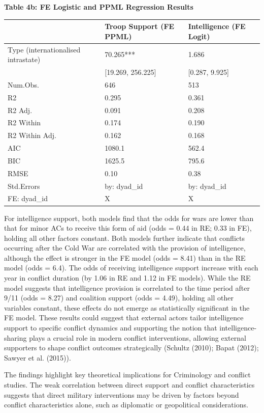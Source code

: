 \documentclass[
]{article}
\begin{document}
\noindent\textbf{Table 4b: FE Logistic and PPML Regression Results}

\begin{tabular}{lll}
\hline
& Troop Support (FE PPML) & Intelligence (FE Logit) \\ \hline
Type (internationalised intrastate) & \num{70.265}*** & \num{1.686} \\
& [\num{19.269}, \num{256.225}] & [\num{0.287}, \num{9.925}] \\
Num.Obs. & \num{646} & \num{513} \\
R2 & \num{0.295} & \num{0.361} \\
R2 Adj. & \num{0.091} & \num{0.208} \\
R2 Within & \num{0.174} & \num{0.190} \\
R2 Within Adj. & \num{0.162} & \num{0.168} \\
AIC & \num{1080.1} & \num{562.4} \\
BIC & \num{1625.5} & \num{795.6} \\
RMSE & \num{0.10} & \num{0.38} \\
Std.Errors & by: dyad\_id & by: dyad\_id \\
FE: dyad\_id & X & X \\
\hline
\end{tabular}

For intelligence support, both models find that the odds for wars are
lower than that for minor ACs to receive this form of aid (odds = 0.44
in RE; 0.33 in FE), holding all other factors constant. Both models
further indicate that conflicts occurring after the Cold War are
correlated with the provision of intelligence, although the effect is
stronger in the FE model (odds = 8.41) than in the RE model (odds =
6.4). The odds of receiving intelligence support increase with each year
in conflict duration (by 1.06 in RE and 1.12 in FE models). While the RE
model suggests that intelligence provision is correlated to the time
period after 9/11 (odds = 8.27) and coalition support (odds = 4.49),
holding all other variables constant, these effects do not emerge as
statistically significant in the FE model. These results could suggest
that external actors tailor intelligence support to specific conflict
dynamics and supporting the notion that intelligence-sharing plays a
crucial role in modern conflict interventions, allowing external
supporters to shape conflict outcomes strategically (Schultz (2010);
Bapat (2012); Sawyer et al. (2015)).

The findings highlight key theoretical implications for Criminology and
conflict studies. The weak correlation between direct support and
conflict characteristics suggests that direct military interventions may
be driven by factors beyond conflict characteristics alone, such as
diplomatic or geopolitical considerations.
\end{document}
